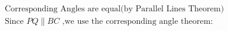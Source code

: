 \documentclass[preview]{standalone}
\begin{document}
\begin{align*}
\text{Corresponding Angles are equal(by Parallel Lines Theorem)}\\ \text{Since } PQ \parallel BC \text{ ,we use the corresponding angle theorem: }
\end{align*}
\end{document}
